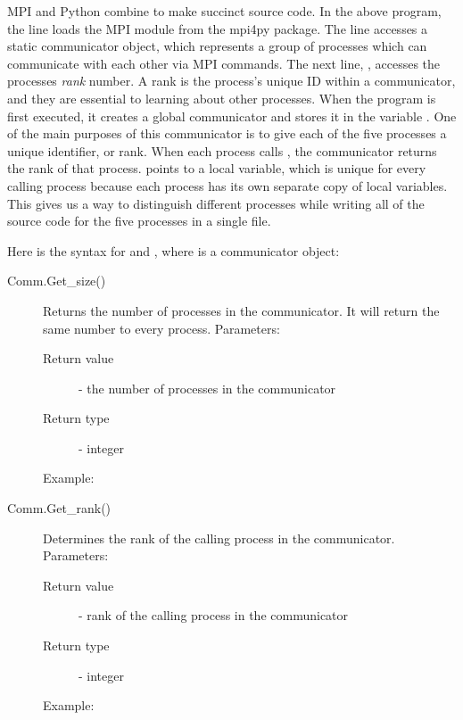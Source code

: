 MPI and Python combine to make succinct source code.
In the above program, the line  loads the MPI module from the mpi4py package.
The line  accesses a static communicator object, which represents a group of processes which can communicate with each other via MPI commands.
The next line, , accesses the processes \emph{rank} number.
A rank is the process's unique ID within a communicator, and they are essential to learning about other processes.
When the program  is first executed, it creates a global communicator and stores it in the variable .
One of the main purposes of this communicator is to give each of the five processes a unique identifier, or rank.
When each process calls , the communicator returns the rank of that process.
 points to a local variable, which is unique for every calling process because each process has its own separate copy of local variables.
This gives us a way to distinguish different processes while writing all of the source code for the five processes in a single file.


Here is the syntax for  and , where  is a communicator object:
\begin{description}
\item[Comm.Get\_size()]
Returns the number of processes in the communicator. It will return the same number to every process.
Parameters:
\begin{description}
    \item[Return value] - the number of processes in the communicator
    \item[Return type] - integer
\end{description}
Example:

\item[Comm.Get\_rank()]
Determines the rank of the calling process in the communicator.
Parameters:
\begin{description}
    \item[Return value] - rank of the calling process in the communicator
    \item[Return type] - integer
\end{description}
Example:

\end{description}

